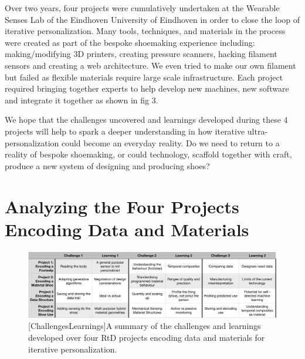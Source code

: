 Over two years, four projects were cumulatively undertaken at the Wearable Senses Lab of the Eindhoven University of Eindhoven in order to close the loop of iterative personalization. Many tools, techniques, and materials in the process were created as part of the bespoke shoemaking experience including: making/modifying 3D printers, creating pressure scanners, hacking filament sensors and creating a web architecture. We even tried to make our own filament but failed as flexible materials require large scale infrastructure. Each project required bringing together experts to help develop new machines, new software and integrate it together as shown in fig 3.

We hope that the challenges uncovered and learnings developed during these 4 projects will help to spark a deeper understanding in how iterative ultra-personalization could become an everyday reality. Do we need to return to a reality of bespoke shoemaking, or could technology, scaffold together with craft, produce a new system of designing and producing shoes?

\section{Analyzing the Four Projects Encoding Data and Materials}

\begin{figure}
\includegraphics[width=.999\textwidth]{Table}
[ChallengesLearnings]{A summary of the challenges and learnings developed over four RtD projects encoding data and materials for iterative personalization.}
\label{fig:ChallengesLearnings}
\end{figure}

